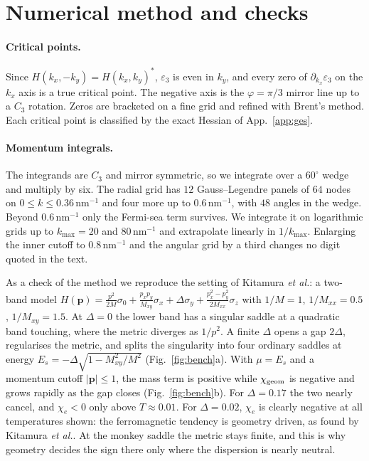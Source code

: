 \documentclass[11pt,a4paper]{article}
\numberwithin{equation}{section}
\newcommand{\chie}{\chi_{e}}
\newcommand{\chig}{\chi_{\rm geom}}
\newcommand{\nm}{\,\mathrm{nm}}
\begin{document}
\section{Numerical method and checks}\label{app:numerics}

\paragraph{Critical points.} Since $H(k_x,-k_y)=H(k_x,k_y)^*$, $\varepsilon_3$ is even in $k_y$, and every zero of $\partial_{k_x}\varepsilon_3$ on the $k_x$ axis is a true critical point. The negative axis is the $\varphi=\pi/3$ mirror line up to a $C_3$ rotation. Zeros are bracketed on a fine grid and refined with Brent's method. Each critical point is classified by the exact Hessian of App.~\ref{app:ges}.

\paragraph{Momentum integrals.} The integrands are $C_3$ and mirror symmetric, so we integrate over a $60^\circ$ wedge and multiply by six. The radial grid has $12$ Gauss--Legendre panels of $64$ nodes on $0\le k\le0.36\nm^{-1}$ and four more up to $0.6\nm^{-1}$, with $48$ angles in the wedge. Beyond $0.6\nm^{-1}$ only the Fermi-sea term survives. We integrate it on logarithmic grids up to $k_{\max}=20$ and $80\nm^{-1}$ and extrapolate linearly in $1/k_{\max}$. Enlarging the inner cutoff to $0.8\nm^{-1}$ and the angular grid by a third changes no digit quoted in the text.




As a check of the method we reproduce the setting of Kitamura \emph{et al.}: a two-band model $H(\mathbf p)=\frac{p^2}{2M}\sigma_0+\frac{p_xp_y}{M_{xy}}\sigma_x+\Delta\sigma_y+\frac{p_x^2-p_y^2}{2M_{xx}}\sigma_z$ with $1/M=1$, $1/M_{xx}=0.5$, $1/M_{xy}=1.5$. At $\Delta=0$ the lower band has a singular saddle at a quadratic band touching, where the metric diverges as $1/p^2$. A finite $\Delta$ opens a gap $2\Delta$, regularises the metric, and splits the singularity into four ordinary saddles at energy $E_s=-\Delta\sqrt{1-M_{xy}^2/M^2}$ (Fig.~\ref{fig:bench}a). With $\mu=E_s$ and a momentum cutoff $|\mathbf p|\le1$, the mass term is positive while $\chig$ is negative and grows rapidly as the gap closes (Fig.~\ref{fig:bench}b). For $\Delta=0.17$ the two nearly cancel, and $\chie<0$ only above $T\approx0.01$. For $\Delta=0.02$, $\chie$ is clearly negative at all temperatures shown: the ferromagnetic tendency is geometry driven, as found by Kitamura \emph{et al.}. At the monkey saddle the metric stays finite, and this is why geometry decides the sign there only where the dispersion is nearly neutral.
\end{document}
